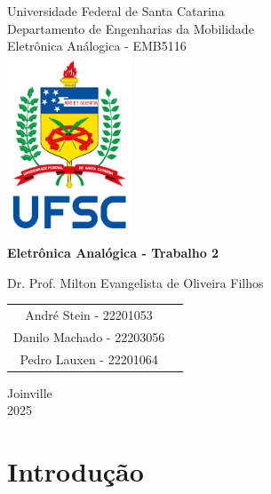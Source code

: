 \documentclass[12pt]{article}
\begin{document}
\begin{titlepage}
    \begin{center}
        Universidade Federal de Santa Catarina\\
        Departamento de Engenharias da Mobilidade \\ Eletrônica Análogica - EMB5116\\

        \vspace{1.5cm}
        \includegraphics[width=0.28\textwidth]{./images/vertical_sigla_fundo_claro.png}

        \vspace*{1.5cm}
        \fontsize{12pt}{16pt}\textbf{Eletrônica Analógica - Trabalho 2}

        \vspace*{1.5cm}
        Dr. Prof. Milton Evangelista de Oliveira Filhos

        \vspace*{1.0cm}
        \begin{tabular}{c c}
                André Stein - 22201053\\
                Danilo Machado - 22203056\\
                Pedro Lauxen - 22201064\\
        \end{tabular}

        \vspace*{\fill}
        {Joinville\\
        2025}
    \end{center}
\end{titlepage}


\tableofcontents\renewcommand*\contentsname{Sumário}
\newpage

\section{Introdução}
\end{document}

